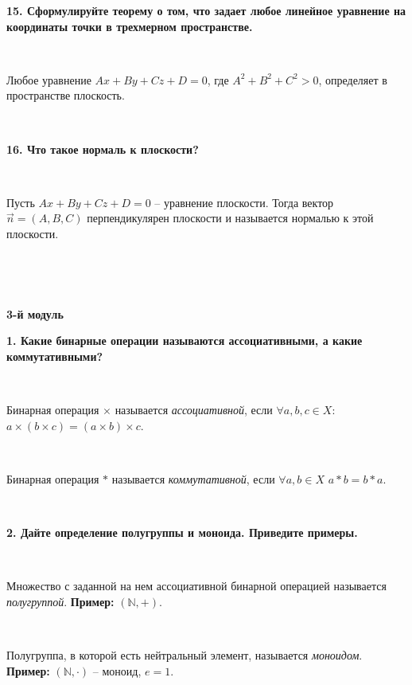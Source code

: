 \documentclass{article}
\begin{document}
    \textbf{15. Сформулируйте теорему о том, что задает любое линейное уравнение на координаты точки в трехмерном пространстве.}

    {
        $\;$
        \setlength{\parindent}{0.4cm}
        \hangindent=0.4cm

    Любое уравнение $Ax+By+Cz+D=0$, где $A^2+B^2+C^2>0$, определяет в пространстве плоскость.

        $\;$
        \setlength{\parindent}{0cm}
        \hangindent=0cm
    }

    \textbf{16. Что такое нормаль к плоскости?}

    {
        $\;$
        \setlength{\parindent}{0.4cm}
        \hangindent=0.4cm

    Пусть $Ax+By+Cz+D=0$ -- уравнение плоскости. Тогда вектор $\overrightarrow{n}=(A, B, C)$
        перпендикулярен плоскости и называется нормалью к этой плоскости.

        $\;$
        \setlength{\parindent}{0cm}
        \hangindent=0cm
    }



    \Large
    \centering

    $\;$

    \textbf{3-й модуль}

    \flushleft
    \small

    \textbf{1. Какие бинарные операции называются ассоциативными, а какие коммутативными?}

    {
        $\;$
        \setlength{\parindent}{0.4cm}
        \hangindent=0.4cm

    Бинарная операция $\times$ называется \textit{ассоциативной}, если $\forall a, b, c\in X:$ $a\times(b\times c)=(a\times b)\times c$.

        $\;$

        Бинарная операция $\ast$ называется \textit{коммутативной}, если $\forall a, b\in X$ $a\ast b=b\ast a$.

        $\;$
        \setlength{\parindent}{0cm}
        \hangindent=0cm
    }

    \textbf{2. Дайте определение полугруппы и моноида. Приведите примеры.}

    {
        $\;$
        \setlength{\parindent}{0.4cm}
        \hangindent=0.4cm

    Множество с заданной на нем ассоциативной бинарной операцией называется \textit{полугруппой}. \textbf{Пример:} $(\mathbb{N}, +)$.

        $\;$

        Полугруппа, в которой есть нейтральный элемент, называется \textit{моноидом}. \textbf{Пример:} $(\mathbb{N}, \cdot)$ -- моноид, $e=1$.

        $\;$
        \setlength{\parindent}{0cm}
        \hangindent=0cm
    }
\end{document}
